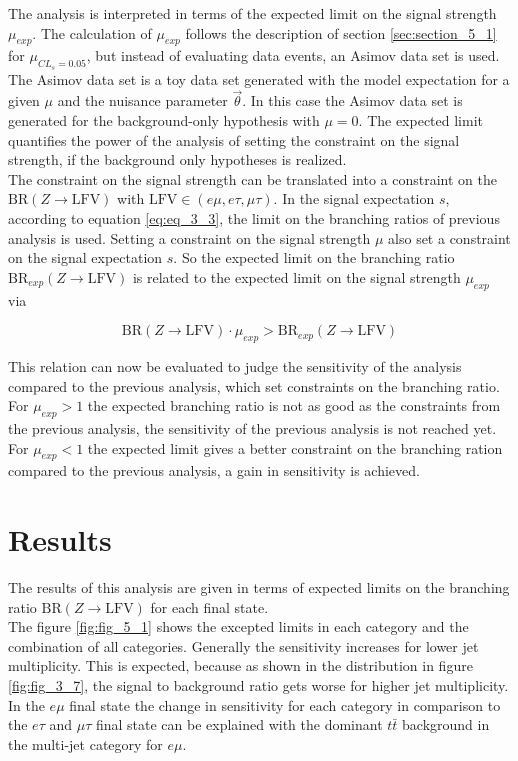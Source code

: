The analysis is interpreted in terms of the expected limit on the signal strength $\mu_{exp}$. The calculation of $\mu_{exp}$ follows the description of section \ref{sec:section_5_1} for $\mu_{CL_s = 0.05}$, but instead of evaluating data events, an Asimov data set \cite{ASIMOV} is used. The Asimov data set is a toy data set generated with the model expectation for a given $\mu$ and the nuisance parameter $\vec{\theta}$. In this case the Asimov data set is generated for the background-only hypothesis with $\mu = 0$. The expected limit quantifies the power of the analysis of setting the constraint on the signal strength, if the background only hypotheses is realized. \\

The constraint on the signal strength can be translated into a constraint on the $\text{BR}(Z\to\text{LFV})$ with $\text{LFV} \in (e\mu, e\tau, \mu\tau)$. In the signal expectation $s$, according to equation \ref{eq:eq_3_3}, the limit on the branching ratios of previous analysis is used. Setting a constraint on the signal strength $\mu$ also set a constraint on the signal expectation $s$. So the expected limit on the branching ratio $\text{BR}_{exp}(Z\to\text{LFV})$ is related to the expected limit on the signal strength $\mu_{exp}$ via 

\begin{equation}
	\text{BR}(Z\to\text{LFV}) \cdot \mu_{exp} > \text{BR}_{exp}(Z\to\text{LFV})
\end{equation}

This relation can now be evaluated to judge the sensitivity of the analysis compared to the previous analysis, which set constraints on the branching ratio. For $\mu_{exp} > 1$ the expected branching ratio is not as good as the constraints from the previous analysis, the sensitivity of the previous analysis is not reached yet. For $\mu_{exp} < 1$ the expected limit gives a better constraint on the branching ration compared to the previous analysis, a gain in sensitivity is achieved. 


\section{Results}
\label{sec:section_5_3}

The results of this analysis are given in terms of expected limits on the branching ratio $\text{BR}(Z\to\text{LFV})$ for each final state. \\

The figure \ref{fig:fig_5_1} shows the excepted limits in each category and the combination of all categories. Generally the sensitivity increases for lower jet multiplicity. This is expected, because as shown in the distribution in figure \ref{fig:fig_3_7}, the signal to background ratio gets worse for higher jet multiplicity. In the $e\mu$ final state the change in sensitivity for each category in comparison to the $e\tau$ and $\mu\tau$ final state can be explained with the dominant $t\bar{t}$ background in the multi-jet category for $e\mu$. \\

